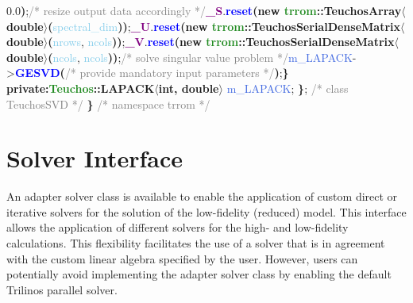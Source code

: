 0.0\textbf{)};\newline\newline\tab\tab\textcolor{gray}{/* resize output data accordingly */}\newline\tab\tab\textbf{\textcolor{Purple}{\_S}}.\textbf{\textcolor{blue}{reset}(new \textcolor{ForestGreen}{trrom}::\textcolor{Melon}{TeuchosArray}$\langle$\textcolor{BrickRed}{double}$\rangle$(}\textcolor{SkyBlue}{spectral\_dim}\textbf{))};\newline\tab\tab\textbf{\textcolor{Purple}{\_U}}.\textbf{\textcolor{blue}{reset}(new \textcolor{ForestGreen}{trrom}::\textcolor{Melon}{TeuchosSerialDenseMatrix}$\langle$\textcolor{BrickRed}{double}$\rangle$(}\textcolor{SkyBlue}{nrows}, \textcolor{SkyBlue}{ncols}\textbf{))};\newline\tab\tab\textbf{\textcolor{Purple}{\_V}}.\textbf{\textcolor{blue}{reset}(new \textcolor{ForestGreen}{trrom}::\textcolor{Melon}{TeuchosSerialDenseMatrix}$\langle$\textcolor{BrickRed}{double}$\rangle$(}\textcolor{SkyBlue}{ncols}, \textcolor{SkyBlue}{ncols}\textbf{))};\newline\newline\tab\tab\textcolor{gray}{/* solve singular value problem */}\newline\tab\tab\textcolor{RoyalBlue}{m\_LAPACK}-\textgreater\textbf{\textcolor{blue}{GESVD}(}\textcolor{gray}{/* provide mandatory input parameters */}\textbf{)};\newline\tab\textbf{\}}\newline\newline
    \textbf{private:}\newline\tab\textbf{\textcolor{ForestGreen}{Teuchos}::\textcolor{Melon}{LAPACK}$\langle$\textcolor{BrickRed}{int}, \textcolor{BrickRed}{double}$\rangle$} \textcolor{RoyalBlue}{m\_LAPACK};\newline
    \textbf{\}}; \textcolor{gray}{/* class TeuchosSVD */} \newline
    \textbf{\}} \textcolor{gray}{/* namespace trrom */}
    
    \section{Solver Interface}\label{sec:Solver}
    
    An adapter solver class is available to enable the application of custom direct or iterative solvers for the solution of the low-fidelity (reduced) model. This interface allows the application of different solvers for the high- and low-fidelity calculations. This flexibility facilitates the use of a solver that is in agreement with the custom linear algebra specified by the user. However, users can potentially avoid implementing the adapter solver class by enabling the default Trilinos parallel solver.
    

